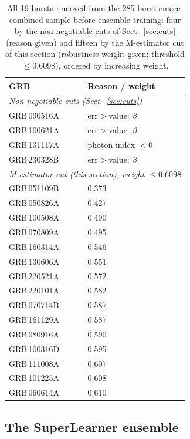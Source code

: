 \documentclass{aa}
\newcommand{\grb}[1]{GRB\,#1}
\begin{document}
\begin{table}
  \centering
  \caption{All 19 bursts removed from the 285-burst emcee-combined sample before
    ensemble training: four by the non-negotiable cuts of Sect.~\ref{sec:cuts}
    (reason given) and fifteen by the M-estimator cut of this section (robustness
    weight given; threshold $\leq0.6098$), ordered by increasing weight.}
  \label{tab:outliers}
  \begin{tabular}{ll}
    \hline\hline
    GRB & Reason / weight \\
    \hline
    \multicolumn{2}{l}{\emph{Non-negotiable cuts (Sect.~\ref{sec:cuts})}} \\
    \grb{090516A} & err$>$value: $\beta$ \\
    \grb{100621A} & err$>$value: $\beta$ \\
    \grb{131117A} & photon index $<0$ \\
    \grb{230328B} & err$>$value: $\beta$ \\
    \hline
    \multicolumn{2}{l}{\emph{M-estimator cut (this section), weight $\leq0.6098$}} \\
    \grb{051109B} & 0.373 \\
    \grb{050826A} & 0.427 \\
    \grb{100508A} & 0.490 \\
    \grb{070809A} & 0.495 \\
    \grb{160314A} & 0.546 \\
    \grb{130606A} & 0.551 \\
    \grb{220521A} & 0.572 \\
    \grb{220101A} & 0.582 \\
    \grb{070714B} & 0.587 \\
    \grb{161129A} & 0.587 \\
    \grb{080916A} & 0.590 \\
    \grb{100316D} & 0.595 \\
    \grb{111008A} & 0.607 \\
    \grb{101225A} & 0.608 \\
    \grb{060614A} & 0.610 \\
    \hline
  \end{tabular}
\end{table}

\subsection{The SuperLearner ensemble}
\label{sec:sl}
\end{document}
